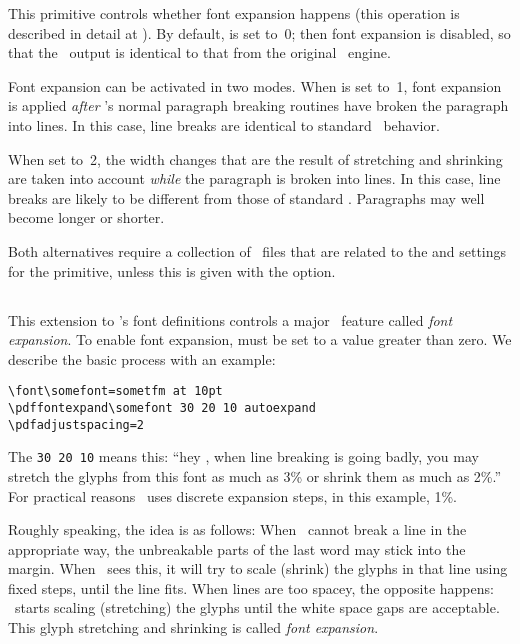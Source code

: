 \documentclass{pdftexmanual}
\begin{document}
This primitive controls whether font expansion happens (this operation
is described in detail at ). By default,
 is set to~0; then font expansion is disabled, so
that the \PDFTEX\ output is identical to that from the original \TEX\
engine.

Font expansion can be activated in two modes. When 
is set to~1, font expansion is applied \emph{after} \TEX's normal
paragraph breaking routines have broken the paragraph into lines. In
this case, line breaks are identical to standard \TEX\ behavior.

When set to~2, the width changes that are the result of stretching and
shrinking are taken into account \emph{while} the paragraph is broken
into lines. In this case, line breaks are likely to be different from
those of standard \TEX. Paragraphs may well become longer or shorter.

Both alternatives require a collection of \TFM\ files that are
related to the  and  settings
for the \cs{pdffontexpand} primitive, unless this is given with the
\type{autoexpand} option.

\subsection{}

This extension to \TEX's font definitions controls a major \PDFTEX\
feature called \emph{font expansion}. To enable font expansion,
\cs{pdfadjustspacing} must be set to a value greater than zero. We
describe the basic process with an example:

\begin{verbatim}
\font\somefont=sometfm at 10pt
\pdffontexpand\somefont 30 20 10 autoexpand
\pdfadjustspacing=2
\end{verbatim}

The \verb|30 20 10| means this: ``hey \TEX, when line breaking is going
badly, you may stretch the glyphs from this font as much as 3\% or
shrink them as much as 2\%.'' For practical reasons \PDFTEX\ uses
discrete expansion steps, in this example, 1\%.

Roughly speaking, the idea is as follows: When \TEX\ cannot break a line
in the appropriate way, the unbreakable parts of the last word may stick
into the margin. When \PDFTEX\ sees this, it will try to scale (shrink)
the glyphs in that line using fixed steps, until the line fits. When
lines are too spacey, the opposite happens: \PDFTEX\ starts scaling
(stretching) the glyphs until the white space gaps are acceptable. This
glyph stretching and shrinking is called \emph{font expansion}.
\end{document}
